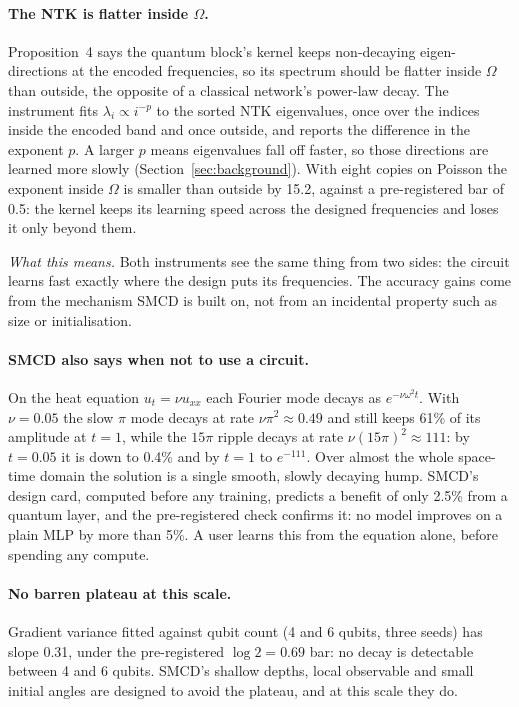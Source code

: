 \paragraph{The NTK is flatter inside $\Omega$.} Proposition~4 says the quantum block's
kernel keeps non-decaying eigen-directions at the encoded frequencies, so its spectrum
should be flatter inside $\Omega$ than outside, the opposite of a classical network's
power-law decay. The instrument fits $\lambda_i\propto i^{-p}$ to the sorted NTK
eigenvalues, once over the indices inside the encoded band and once outside, and reports
the difference in the exponent $p$. A larger $p$ means eigenvalues fall off faster, so
those directions are learned more slowly (Section~\ref{sec:background}). With eight copies
on Poisson the exponent inside $\Omega$ is smaller than outside by 15.2, against a
pre-registered bar of 0.5: the kernel keeps its learning speed across the designed
frequencies and loses it only beyond them.

\emph{What this means.} Both instruments see the same thing from two sides: the circuit
learns fast exactly where the design puts its frequencies. The accuracy gains come from
the mechanism SMCD is built on, not from an incidental property such as size or
initialisation.

\paragraph{SMCD also says when not to use a circuit.} On the heat equation
$u_t=\nu u_{xx}$ each Fourier mode decays as $e^{-\nu\omega^2t}$. With $\nu=0.05$ the slow
$\pi$ mode decays at rate $\nu\pi^2\approx0.49$ and still keeps 61\% of its amplitude at
$t=1$, while the $15\pi$ ripple decays at rate $\nu(15\pi)^2\approx111$: by $t=0.05$ it is
down to 0.4\% and by $t=1$ to $e^{-111}$. Over almost the whole space-time domain the
solution is a single smooth, slowly decaying hump. SMCD's design card, computed before any
training, predicts a benefit of only 2.5\% from a quantum layer, and the pre-registered
check confirms it: no model improves on a plain MLP by more than 5\%. A user learns this
from the equation alone, before spending any compute.

\paragraph{No barren plateau at this scale.} Gradient variance fitted against qubit count
(4 and 6 qubits, three seeds) has slope 0.31, under the pre-registered $\log2=0.69$ bar:
no decay is detectable between 4 and 6 qubits. SMCD's shallow depths, local observable
and small initial angles are designed to avoid the plateau, and at this scale they do.

